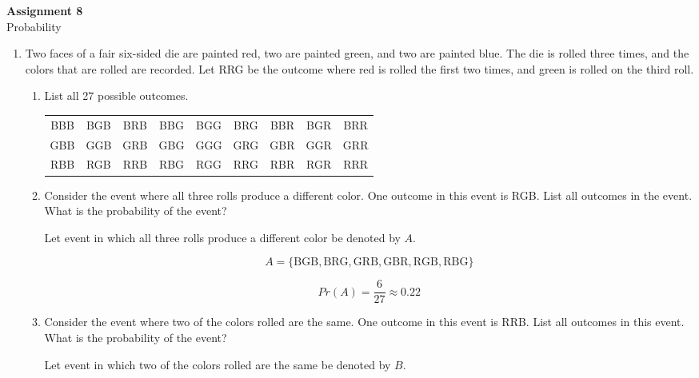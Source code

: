 \documentclass[11pt, letterpaper, includehead]{article}
\theoremstyle{plain}
\theoremstyle{mydefinition}
\theoremstyle{myproperty}
\begin{document}
 

\pagestyle{fancy}
\fancyhead{}
\fancyfoot{}


\begin{center}
    \Large{\textbf{Assignment 8}}\\
    \Large{Probability}
\end{center}

\begin{enumerate}[label=\textbf{\arabic*}., leftmargin=*]
\item Two faces of a fair six-sided die are painted red, two are painted green, and two are painted blue. The die is rolled three times, and the colors that are rolled are recorded. Let RRG be the outcome where red is rolled the first two times, and green is rolled on the third roll.
\begin{enumerate}[label=(\alph*)]
    \item List all 27 possible outcomes.
    \begin{center}
        \begin{tabular}{ccccccccc}
        BBB & BGB & BRB & BBG & BGG & BRG & BBR & BGR & BRR \\
        GBB & GGB & GRB & GBG & GGG & GRG & GBR & GGR & GRR \\
        RBB & RGB & RRB & RBG & RGG & RRG & RBR & RGR & RRR \\
        \end{tabular}
    \end{center}

    \item Consider the event where all three rolls produce a different color. One outcome in this event is RGB. List all outcomes in the event. What is the probability of the event?
   
    Let event in which all three rolls produce a different color be denoted by $A$.

    \[A = \{\text{BGB}, \text{BRG}, \text{GRB}, \text{GBR}, \text{RGB}, \text{RBG}\}\]

    \[Pr(A) = \frac{6}{27} \approx 0.22\]

    \item Consider the event where two of the colors rolled are the same. One outcome in this event is RRB. List all outcomes in this event. What is the probability of the event?
    
    Let event in which two of the colors rolled are the same be denoted by $B$.


\end{enumerate}
\end{enumerate}
\end{document}

